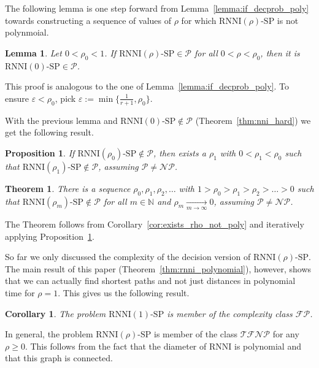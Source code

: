 \documentclass[11pt]{amsart}
\newtheorem{proposition}{Proposition}
\newtheorem{theorem}{Theorem}
\newtheorem{lemma}{Lemma}
\newtheorem{corollary}{Corollary}
\newcommand{\rnni}{\mathrm{RNNI}}
\newcommand{\tfnp}{\mathcal{TFNP}}
\newcommand{\fpc}{\mathcal{FP}}
\newcommand{\np}{\mathcal{NP}}
\newcommand{\p}{\mathcal{P}}
\newcommand{\decprob}[1]{\rnni(#1)\text{-}\mathrm{SP}}
\renewcommand{\epsilon}{\varepsilon}
\begin{document}
The following lemma is one step forward from Lemma~\ref{lemma:if_decprob_poly} towards constructing a sequence of values of $\rho$ for which $\decprob{\rho}$ is not polynmoial.

\begin{lemma}
    Let $0 < \rho_0 < 1$.
    If $\decprob{\rho} \in \p$ for all $0<\rho<\rho_0$, then it is ${\decprob{0} \in \p}$.
\end{lemma}

\proof
	This proof is analogous to the one of Lemma~\ref{lemma:if_decprob_poly}.
	To ensure $\epsilon < \rho_0$, pick $\epsilon := \min\{\frac{1}{r + 1}, \rho_0\}$.
\endproof

With the previous lemma and $\decprob{0} \notin \p$ (Theorem~\ref{thm:nni_hard}) we get the following result.

\begin{proposition}
    If $\decprob{\rho_0} \notin \p$, then exists a $\rho_1$ with $0 < \rho_1 < \rho_0$ such that ${\decprob{\rho_1} \notin \p}$, assuming $\p \neq \np$.
    \label{proposition:more_rho_not_poly}
\end{proposition}

\begin{theorem}
    There is a sequence $\rho_0, \rho_1, \rho_2, \ldots$ with $1 > \rho_0 > \rho_1 > \rho_2 > \ldots > 0$ such that $\decprob{\rho_m} \notin \p$ for all $m \in \mathbb N$ and $\rho_m \underset{m \rightarrow \infty}{\longrightarrow} 0$, assuming $\p \neq \np$.
\end{theorem}

\proof
    The Theorem follows from Corollary~\ref{cor:exists_rho_not_poly} and iteratively applying Proposition~\ref{proposition:more_rho_not_poly}.
\endproof

So far we only discussed the complexity of the decision version of $\decprob{\rho}$.
The main result of this paper (Theorem~\ref{thm:rnni_polynomial}), however, shows that we can actually find shortest paths and not just distances in polynomial time for $\rho = 1$.
This gives us the following result.

\begin{corollary}
	The problem $\decprob{1}$ is member of the complexity class $\fpc$.
\end{corollary}

In general, the problem $\decprob{\rho}$ is member of the class $\tfnp$ \autocite{Megiddo1991-lr} for any $\rho \geq 0$.
This follows from the fact that the diameter of $\rnni$ is polynomial and that this graph is connected.
\end{document}
